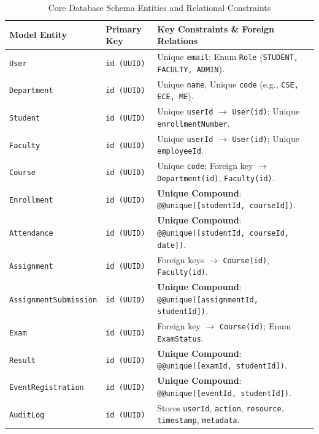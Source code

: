 \begin{table}[htbp]
\centering
\caption{Core Database Schema Entities and Relational Constraints}
\label{tab:schema_models}
\small
\begin{tabular}{L{3.5cm} L{3.5cm} L{8.0cm}}
\hline
\textbf{Model Entity} & \textbf{Primary Key} & \textbf{Key Constraints \& Foreign Relations} \\ \hline
\texttt{User} & \texttt{id (UUID)} & Unique \texttt{email}; Enum \texttt{Role} (\texttt{STUDENT, FACULTY, ADMIN}). \\
\texttt{Department} & \texttt{id (UUID)} & Unique \texttt{name}, Unique \texttt{code} (e.g., \texttt{CSE, ECE, ME}). \\
\texttt{Student} & \texttt{id (UUID)} & Unique \texttt{userId} $\rightarrow$ \texttt{User(id)}; Unique \texttt{enrollmentNumber}. \\
\texttt{Faculty} & \texttt{id (UUID)} & Unique \texttt{userId} $\rightarrow$ \texttt{User(id)}; Unique \texttt{employeeId}. \\
\texttt{Course} & \texttt{id (UUID)} & Unique \texttt{code}; Foreign key $\rightarrow$ \texttt{Department(id)}, \texttt{Faculty(id)}. \\
\texttt{Enrollment} & \texttt{id (UUID)} & \textbf{Unique Compound}: \texttt{@@unique([studentId, courseId])}. \\
\texttt{Attendance} & \texttt{id (UUID)} & \textbf{Unique Compound}: \texttt{@@unique([studentId, courseId, date])}. \\
\texttt{Assignment} & \texttt{id (UUID)} & Foreign keys $\rightarrow$ \texttt{Course(id)}, \texttt{Faculty(id)}. \\
\texttt{AssignmentSubmission} & \texttt{id (UUID)} & \textbf{Unique Compound}: \texttt{@@unique([assignmentId, studentId])}. \\
\texttt{Exam} & \texttt{id (UUID)} & Foreign key $\rightarrow$ \texttt{Course(id)}; Enum \texttt{ExamStatus}. \\
\texttt{Result} & \texttt{id (UUID)} & \textbf{Unique Compound}: \texttt{@@unique([examId, studentId])}. \\
\texttt{EventRegistration} & \texttt{id (UUID)} & \textbf{Unique Compound}: \texttt{@@unique([eventId, studentId])}. \\
\texttt{AuditLog} & \texttt{id (UUID)} & Stores \texttt{userId}, \texttt{action}, \texttt{resource}, \texttt{timestamp}, \texttt{metadata}. \\ \hline
\end{tabular}
\end{table}

